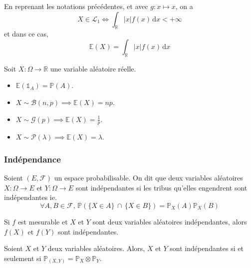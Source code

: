 	\begin{remark}
		En reprenant les notations précédentes, et avec $g : x \mapsto x$, on a
		\[ X \in \mathcal{L}_1 \iff \int_{\mathbb{R}} \vert x \vert f(x) \, \mathrm{d}x < +\infty \]
		et dans ce cas,
		\[ \mathbb{E}(X) = \int_{\mathbb{R}} \vert x \vert f(x) \, \mathrm{d}x \]
	\end{remark}
	
	
	\begin{example}
		Soit $X : \Omega \rightarrow \mathbb{R}$ une variable aléatoire réelle.
		\begin{itemize}
			\item $\mathbb{E}(\mathbb{1}_A) = \mathbb{P}(A)$.
			\item $X \sim \mathcal{B}(n, p) \implies \mathbb{E}(X) = np$.
			\item $X \sim \mathcal{G}(p) \implies \mathbb{E}(X) = \frac{1}{p}$.
			\item $X \sim \mathcal{P}(\lambda) \implies \mathbb{E}(X) = \lambda$.
		\end{itemize}
	\end{example}
	
	\subsubsection{Indépendance}
	
	
	\begin{definition}
		Soient $(E, \mathcal{F})$ un espace probabilisable. On dit que deux variables aléatoires $X : \Omega \rightarrow E$ et $Y : \Omega \rightarrow E$ sont indépendantes si les tribus qu'elles engendrent sont indépendantes ie.
		\[ \forall A, B \in \mathcal{F}, \, \mathbb{P}(\{ X \in A \} \, \cap \, \{ X \in B \}) = \mathbb{P}_X(A) \mathbb{P}_X(B) \]
	\end{definition}
	
	\begin{proposition}
		Si $f$ est mesurable et $X$ et $Y$ sont deux variables aléatoires indépendantes, alors $f(X)$ et $f(Y)$ sont indépendantes.
	\end{proposition}
	
	\begin{theorem}
		Soient $X$ et $Y$ deux variables aléatoires. Alors, $X$ et $Y$ sont indépendantes si et seulement si $\mathbb{P}_{(X,Y)} = \mathbb{P}_X \otimes \mathbb{P}_Y$.
	\end{theorem}
	
